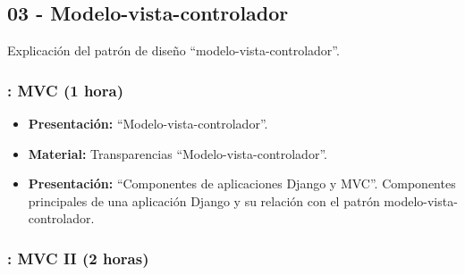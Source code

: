 \documentclass[a4paper,12pt]{article}
\begin{document}
\subsection{03 - Modelo-vista-controlador}

Explicación del patrón de diseño ``modelo-vista-controlador''.

\subsubsection{\martesG: MVC (1 hora)}
\label{cal:martesG}

\begin{itemize}
\item \textbf{Presentación:} ``Modelo-vista-controlador''.
\item \textbf{Material:} Transparencias ``Modelo-vista-controlador''.
\item \textbf{Presentación:} ``Componentes de aplicaciones Django y MVC''.
  Componentes principales de una aplicación Django y su relación con el patrón modelo-vista-controlador.

\end{itemize}

\subsubsection{\martesH: MVC II (2 horas)}
\label{cal:martesH}

\end{document}
